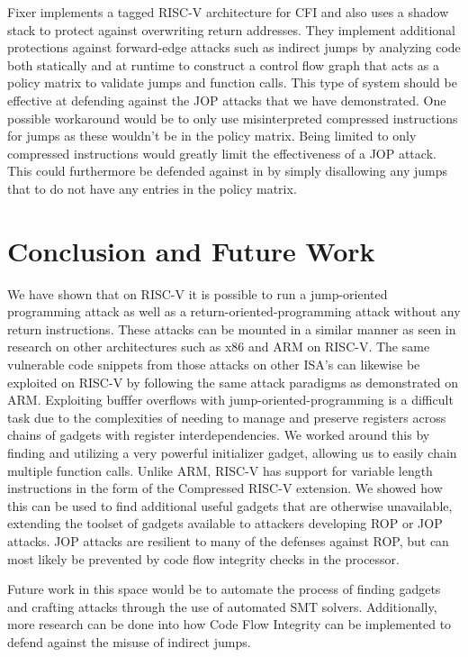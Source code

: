 Fixer \cite{fixer} implements a tagged RISC-V architecture for CFI and also 
uses a shadow stack to protect against overwriting return addresses. They 
implement additional protections against forward-edge attacks such as indirect
jumps by analyzing code both statically and at runtime to construct a control
flow graph that acts as a policy matrix to validate jumps and function calls.
This type of system should be effective at defending against the JOP attacks
that we have demonstrated. One possible workaround would be to only use
misinterpreted compressed instructions for jumps as these wouldn't be in the
policy matrix. Being limited to only compressed instructions would greatly limit
the effectiveness of a JOP attack. This could furthermore be defended against
in by simply disallowing any jumps that to do not have any entries in the policy
matrix.
\section{Conclusion and Future Work}
We have shown that on RISC-V it is possible to run a jump-oriented programming
attack as well as a return-oriented-programming attack without any return
instructions. These attacks can be mounted in a similar manner as seen in
research on other architectures such as x86 and ARM on RISC-V. The same vulnerable
code snippets from those attacks on other ISA's can likewise be exploited on RISC-V
by following the same attack paradigms as demonstrated on ARM. Exploiting bufffer
overflows with jump-oriented-programming is a difficult task due to the complexities
of needing to manage and preserve registers across chains of gadgets with register
interdependencies. We worked around this by finding and utilizing a very powerful
initializer gadget, allowing us to easily chain multiple function calls. Unlike ARM,
RISC-V has support for variable length instructions in the form of the Compressed
RISC-V extension. We showed how this can be used to find additional useful gadgets
that are otherwise unavailable, extending the toolset of gadgets available to
attackers developing ROP or JOP attacks. JOP attacks are resilient to many of
the defenses against ROP, but can most likely be prevented by code flow integrity
checks in the processor.

Future work in this space would be to automate the process of finding gadgets and
crafting attacks through the use of automated SMT solvers. Additionally, more
research can be done into how Code Flow Integrity can be implemented to defend against
the misuse of indirect jumps.



